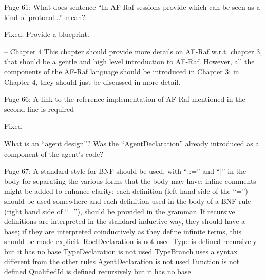 \documentclass{article}
\newcommand{\todo}[1]{[\textcolor{red}{TODO}: #1]}
\newenvironment{them}{\noindent\begingroup\color{blue}}{\endgroup\par}
\begin{document}
\begin{them}

Page 61:
What does sentence “In AF-Raf sessions provide which can be seen as a kind of
protocol...” mean?

\end{them}
Fixed. Provide a blueprint.

\begin{them}

-- Chapter 4
This chapter should provide more details on AF-Raf w.r.t. chapter 3, that
should be a gentle and high level introduction to AF-Raf. However, all the
components of the AF-Raf language should be introduced in Chapter 3: in Chapter
4, they should just be discussed in more detail.

\end{them}
\todo{}

\begin{them}

Page 66:
A link to the reference implementation of AF-Raf mentioned in the second line
is required

\end{them}
Fixed

\begin{them}

What is an “agent design”? Was the “AgentDeclaration” already introduced as a
component of the agent's code?

\end{them}
\todo{explain}

\begin{them}

Page 67:
A standard style for BNF should be used, with “::=” and “|” in the body for
separating the various forms that the body may have; inline comments might be
added to enhance clarity; each definition (left hand side of the “=”) should be
used somewhere and each definition used in the body of a BNF rule (right hand
side of “=”), should be provided in the grammar. If recursive definitions are
interpreted in the standard inductive way, they should have a base; if they are
interpreted coinductively as they define infinite terms, this should be made
explicit.  RoelDeclaration is not used Type is defined recursively but it has
no base TypeDeclaration is not used TypeBranch uses a syntax different from the
other rules AgentDeclaration is not used Function is not defined QualifiedId is
defined recursively but it has no base

\end{them}
\todo{}
\end{document}
